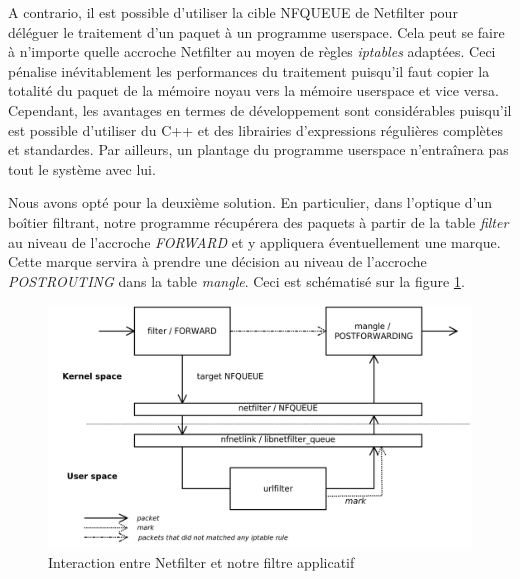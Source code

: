A contrario, il est possible d'utiliser la cible NFQUEUE de Netfilter
pour déléguer le traitement d'un paquet à un programme userspace. Cela
peut se faire à n'importe quelle accroche Netfilter au moyen de règles
\textit{iptables} adaptées. Ceci pénalise inévitablement les
performances du traitement puisqu'il faut copier la totalité du paquet
de la mémoire noyau vers la mémoire userspace et vice
versa. Cependant, les avantages en termes de développement sont
considérables puisqu'il est possible d'utiliser du C++ et des
librairies d'expressions régulières complètes et standardes. Par
ailleurs, un plantage du programme userspace n'entraînera pas tout le
système avec lui.

Nous avons opté pour la deuxième solution. En particulier, dans
l'optique d'un boîtier filtrant, notre programme récupérera des
paquets à partir de la table \textit{filter} au niveau de l'accroche
\textit{FORWARD} et y appliquera éventuellement une marque. Cette
marque servira à prendre une décision au niveau de l'accroche
\textit{POSTROUTING} dans la table \textit{mangle}. Ceci est
schématisé sur la figure \ref{schema1}.

\begin{figure}
  \begin{center}
    \includegraphics[scale=0.2]{report/schema1.png}
    \caption{Interaction entre Netfilter et notre filtre applicatif}
    \label{schema1}
  \end{center}
\end{figure}
